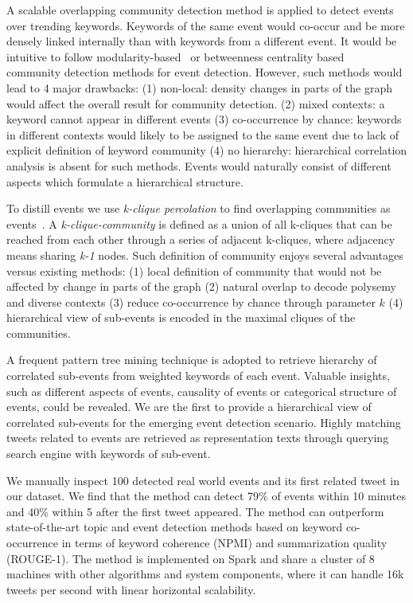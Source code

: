 A scalable overlapping community detection method is applied to detect events over trending keywords.
Keywords of the same event would co-occur and be more densely linked internally than with keywords from a different event.
It would be intuitive to follow modularity-based~\cite{weng2011event} or betweenness centrality based~\cite{sayyadi2013toit}
community detection methods for event detection.
However, such methods would lead to 4 major drawbacks:
(1) non-local: density changes in parts of the graph would affect the overall result for community detection.
(2) mixed contexts: a keyword cannot appear in different events
(3) co-occurrence by chance: keywords in different contexts would likely to be assigned to the same event due to lack of explicit definition of keyword community
(4) no hierarchy: hierarchical correlation analysis is absent for such methods.
Events would naturally consist of different aspects which formulate a hierarchical structure.

To distill events
we use \emph{k-clique percolation} to find overlapping communities as events~\cite{palla2005uncovering}.
A \emph{k-clique-community} is defined as a union of all k-cliques that can be reached from each other through a series of
adjacent k-cliques, where adjacency means sharing \emph{k-1} nodes.
Such definition of community enjoys several advantages versus existing methods:
(1) local definition of community that would not be affected by change in parts of the graph
(2) natural overlap to decode polysemy and diverse contexts
(3) reduce co-occurrence by chance through parameter $k$
(4) hierarchical view of sub-events is encoded in the maximal cliques of the communities.

A frequent pattern tree mining technique is adopted to retrieve hierarchy of correlated sub-events from weighted keywords of each event.
Valuable insights, such as different aspects of events, causality of events or categorical structure of events, could be revealed.
We are the first to provide a hierarchical view of correlated sub-events for the emerging event detection scenario.
Highly matching tweets related to events are retrieved as representation texts through querying search engine with keywords of sub-event.

We manually inspect 100 detected real world events and its first related tweet in our dataset.
We find that the method can detect 79\% of events within 10 minutes and 40\% within 5 after the first tweet appeared.
The method can outperform state-of-the-art topic and event detection methods based on keyword
co-occurrence \cite{weng2011event, sayyadi2013toit, yan2013biterm} in terms of keyword coherence (NPMI) and summarization quality (ROUGE-1).
The method is implemented on Spark and share a cluster of 8 machines
with other algorithms and system components, where it can handle 16k tweets per second with linear horizontal scalability.


